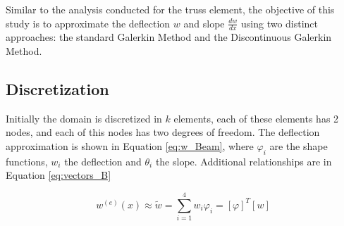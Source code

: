 \documentclass{article}
\begin{document}
\vspace{2ex}

Similar to the analysis conducted for the truss element, the objective of this study is to approximate the deflection $w$ and slope $\frac{dw}{dx}$ using two distinct approaches: the standard Galerkin Method and the Discontinuous Galerkin Method. 

\subsection{Discretization}

Initially the domain is discretized in $k$ elements, each of these elements has 2 nodes, and each of this nodes has two degrees of freedom. The deflection approximation is shown in Equation \ref{eq:w_Beam}, where $\varphi_i$ are the shape functions, $w_i$ the deflection and $\theta_i$ the slope. Additional relationships are in Equation \ref{eq:vectors_B}

\vspace{2ex}

\begin{equation}\label{eq:w_Beam}
    w^{(e)}\left(x\right)\approx\tilde{w}=\sum_{i=1}^{4}{w_i\varphi_i}=\left[\varphi\right]^T[w]
\end{equation}

\vspace{2ex}
\end{document}
